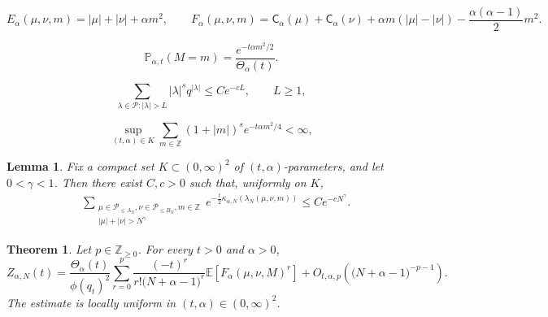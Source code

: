\documentclass[10pt,a4paper]{amsart}
\newtheorem{lemma}{Lemma}
\newtheorem{theorem}{Theorem}
\newcommand\E{{\mathbb E}}
\newcommand\Pbb{{\mathbb P}}
\newcommand\Pcal{{\mathcal P}}
\newcommand\Z{{\mathbb Z}}
\newcommand\cA{{\mathsf C}}
\begin{document}
\begin{equation}\label{eq:Ealpha}
E_\alpha(\mu,\nu,m)=|\mu|+|\nu|+\alpha m^2,\qquad F_\alpha(\mu,\nu,m)=\cA_\alpha(\mu)+\cA_\alpha(\nu)+\alpha m(|\mu|-|\nu|)-\frac{\alpha(\alpha-1)}2m^2.
\end{equation}

\begin{equation}\label{eq:discrete-Gaussian}
\Pbb_{\alpha,t}(M=m)=\frac{e^{-t\alpha m^2/2}}{\Theta_\alpha(t)}.
\end{equation}

\begin{equation}\label{eq:q-tail}
\sum_{\lambda\in\Pcal:|\lambda|>L}|\lambda|^s q^{|\lambda|} \leq Ce^{-cL},\qquad L\geq1,
\end{equation}

\begin{equation}\label{eq:gaussian-moments}
\sup_{(t,\alpha)\in K} \sum_{m\in\Z}(1+|m|)^s e^{-t\alpha m^2/4}<\infty,
\end{equation}

\begin{lemma}\label{lem:trace-tail}
Fix a compact set $K\subset(0,\infty)^2$ of $(t,\alpha)$-parameters, and let $0<\gamma<1$.  Then there exist $C,c>0$ such that, uniformly on $K$,
\begin{align}\label{eq:trace-tail}
&\sum_{\substack{\mu\in\Pcal_{\leq A_N},\nu\in\Pcal_{\leq B_N},m\in\Z\\
|\mu|+|\nu|>N^\gamma}}
e^{-\frac t2\kappa_{\alpha,N}(\lambda_N(\mu,\nu,m))}
\leq Ce^{-cN^\gamma}.
\end{align}
\end{lemma}

\begin{theorem}\label{thm:heat-expansion}
Let $p\in\Z_{\geq0}$.  For every $t>0$ and $\alpha>0$,
\begin{equation}\label{eq:heat-expansion}
Z_{\alpha,N}(t) =\frac{\Theta_\alpha(t)}{\phi(q_t)^2} \sum_{r=0}^{p} \frac{(-t)^r}{r!\bigl(N+\alpha-1\bigr)^r} \E\left[F_\alpha(\mu,\nu,M)^r\right] +O_{t,\alpha,p}(\bigl(N+\alpha-1\bigr)^{-p-1}).
\end{equation}
The estimate is locally uniform in $(t,\alpha)\in(0,\infty)^2$.
\end{theorem}
\end{document}
